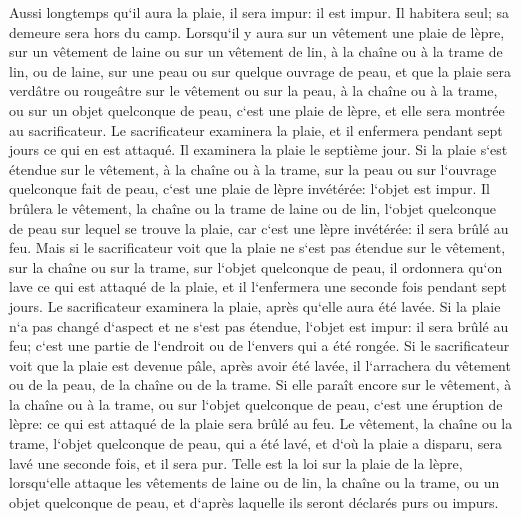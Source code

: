 \verse Aussi longtemps qu`il aura la plaie, il sera impur: il est impur. Il habitera seul; sa demeure sera hors du camp. 
\verse Lorsqu`il y aura sur un vêtement une plaie de lèpre, sur un vêtement de laine ou sur un vêtement de lin, 
\verse à la chaîne ou à la trame de lin, ou de laine, sur une peau ou sur quelque ouvrage de peau, 
\verse et que la plaie sera verdâtre ou rougeâtre sur le vêtement ou sur la peau, à la chaîne ou à la trame, ou sur un objet quelconque de peau, c`est une plaie de lèpre, et elle sera montrée au sacrificateur. 
\verse Le sacrificateur examinera la plaie, et il enfermera pendant sept jours ce qui en est attaqué. 
\verse Il examinera la plaie le septième jour. Si la plaie s`est étendue sur le vêtement, à la chaîne ou à la trame, sur la peau ou sur l`ouvrage quelconque fait de peau, c`est une plaie de lèpre invétérée: l`objet est impur. 
\verse Il brûlera le vêtement, la chaîne ou la trame de laine ou de lin, l`objet quelconque de peau sur lequel se trouve la plaie, car c`est une lèpre invétérée: il sera brûlé au feu. 
\verse Mais si le sacrificateur voit que la plaie ne s`est pas étendue sur le vêtement, sur la chaîne ou sur la trame, sur l`objet quelconque de peau, 
\verse il ordonnera qu`on lave ce qui est attaqué de la plaie, et il l`enfermera une seconde fois pendant sept jours. 
\verse Le sacrificateur examinera la plaie, après qu`elle aura été lavée. Si la plaie n`a pas changé d`aspect et ne s`est pas étendue, l`objet est impur: il sera brûlé au feu; c`est une partie de l`endroit ou de l`envers qui a été rongée. 
\verse Si le sacrificateur voit que la plaie est devenue pâle, après avoir été lavée, il l`arrachera du vêtement ou de la peau, de la chaîne ou de la trame. 
\verse Si elle paraît encore sur le vêtement, à la chaîne ou à la trame, ou sur l`objet quelconque de peau, c`est une éruption de lèpre: ce qui est attaqué de la plaie sera brûlé au feu. 
\verse Le vêtement, la chaîne ou la trame, l`objet quelconque de peau, qui a été lavé, et d`où la plaie a disparu, sera lavé une seconde fois, et il sera pur. 
\verse Telle est la loi sur la plaie de la lèpre, lorsqu`elle attaque les vêtements de laine ou de lin, la chaîne ou la trame, ou un objet quelconque de peau, et d`après laquelle ils seront déclarés purs ou impurs. 

